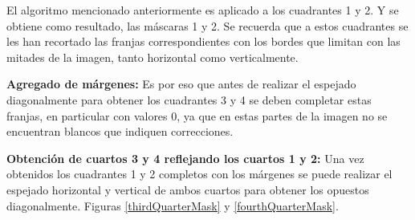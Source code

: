 \documentclass[10pt,a4paper, twoside]{report}
\newcounter{subsubsubsection}[subsubsection]
\begin{document}

El algoritmo mencionado anteriormente es aplicado a los cuadrantes 1 y 2. Y se obtiene como resultado, las máscaras 1 y 2. Se recuerda que a estos cuadrantes se les han recortado las franjas correspondientes con los bordes que limitan con las mitades de la imagen, tanto horizontal como verticalmente.

\textbf{Agregado de márgenes:} Es por eso que antes de realizar el espejado diagonalmente para obtener los cuadrantes 3 y 4 se deben completar estas franjas, en particular con valores 0, ya que en estas partes de la imagen no se encuentran blancos que indiquen correcciones.

\textbf{Obtención de cuartos 3 y 4 reflejando los cuartos 1 y 2:} Una vez obtenidos los cuadrantes 1 y 2 completos con los márgenes se puede realizar el espejado horizontal y vertical de ambos cuartos para obtener los opuestos diagonalmente. Figuras \ref{thirdQuarterMask} y \ref{fourthQuarterMask}.
\end{document}
